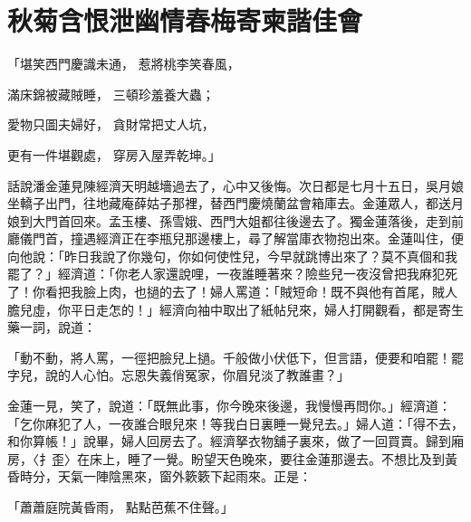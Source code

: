 %

\chapter{秋菊含恨泄幽情\KG 春梅寄柬諧佳會}

「堪笑西門慶識未通，  惹將桃李笑春風，

滿床錦被藏賊睡，   三頓珍羞養大蟲；

愛物只圖夫婦好，   貪財常把丈人坑，

更有一件堪觀處，   穿房入屋弄乾坤。」

話說潘金蓮見陳經濟天明越墻過去了，心中又後悔。次日都是七月十五日，吳月娘坐轎子出門，往地藏庵薛姑子那裡，替西門慶燒蘭盆會箱庫去。金蓮眾人，都送月娘到大門首回來。孟玉樓、孫雪娥、西門大姐都往後邊去了。獨金蓮落後，走到前廳儀門首，撞遇經濟正在李瓶兒那邊樓上，尋了解當庫衣物抱出來。金蓮叫住，便向他說：「昨日我說了你幾句，你如何使性兒，今早就跳博出來了？莫不真個和我罷了？」經濟道：「你老人家還說哩，一夜誰睡著來？險些兒一夜沒曾把我麻犯死了！你看把我臉上肉，也撾的去了！婦人罵道：「賊短命！既不與他有首尾，賊人膽兒虛，你平日走怎的！」經濟向袖中取出了紙帖兒來，婦人打開觀看，都是寄生藥一詞，說道：

「動不動，將人罵，一徑把臉兒上撾。千般做小伏低下，但言語，便要和咱罷！罷字兒，說的人心怕。忘恩失義俏冤家，你眉兒淡了教誰畫？」

金蓮一見，笑了，說道：「既無此事，你今晚來後邊，我慢慢再問你。」經濟道：「乞你麻犯了人，一夜誰合眼兒來！等我白日裏睡一覺兒去。」婦人道：「得不去，和你算帳！」說畢，婦人回房去了。經濟拏衣物舖子裏來，做了一回買賣。歸到廂房，〈扌歪〉在床上，睡了一覺。盼望天色晚來，要往金蓮那邊去。不想比及到黃昏時分，天氣一陣陰黑來，窗外簌簌下起雨來。正是：

「蕭蕭庭院黃昏雨，  點點芭蕉不住聲。」

